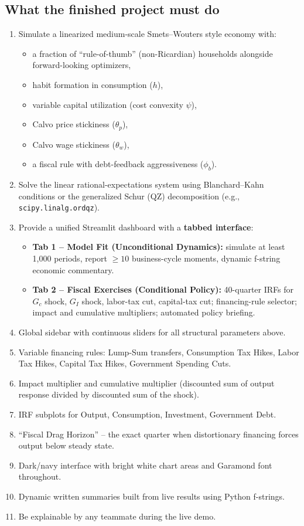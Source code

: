 \documentclass[11pt]{article}
\begin{document}
\subsection{What the finished project must do}
\begin{enumerate}[label=\textbf{\arabic*.}]
    \item Simulate a linearized medium-scale Smets--Wouters style economy with:
    \begin{itemize}
        \item a fraction of ``rule-of-thumb'' (non-Ricardian) households alongside forward-looking optimizers,
        \item habit formation in consumption ($h$),
        \item variable capital utilization (cost convexity $\psi$),
        \item Calvo price stickiness ($\theta_p$),
        \item Calvo wage stickiness ($\theta_w$),
        \item a fiscal rule with debt-feedback aggressiveness ($\phi_b$).
    \end{itemize}
    \item Solve the linear rational-expectations system using Blanchard--Kahn conditions or the generalized Schur (QZ) decomposition (e.g., \texttt{scipy.linalg.ordqz}).
    \item Provide a unified Streamlit dashboard with a \textbf{tabbed interface}:
    \begin{itemize}
        \item \textbf{Tab 1 -- Model Fit (Unconditional Dynamics):} simulate at least 1{,}000 periods, report $\geq 10$ business-cycle moments, dynamic f-string economic commentary.
        \item \textbf{Tab 2 -- Fiscal Exercises (Conditional Policy):} 40-quarter IRFs for $G_c$ shock, $G_I$ shock, labor-tax cut, capital-tax cut; financing-rule selector; impact and cumulative multipliers; automated policy briefing.
    \end{itemize}
    \item Global sidebar with continuous sliders for all structural parameters above.
    \item Variable financing rules: Lump-Sum transfers, Consumption Tax Hikes, Labor Tax Hikes, Capital Tax Hikes, Government Spending Cuts.
    \item Impact multiplier and cumulative multiplier (discounted sum of output response divided by discounted sum of the shock).
    \item IRF subplots for Output, Consumption, Investment, Government Debt.
    \item ``Fiscal Drag Horizon'' -- the exact quarter when distortionary financing forces output below steady state.
    \item Dark/navy interface with bright white chart areas and Garamond font throughout.
    \item Dynamic written summaries built from live results using Python f-strings.
    \item Be explainable by any teammate during the live demo.
\end{enumerate}
\end{document}
